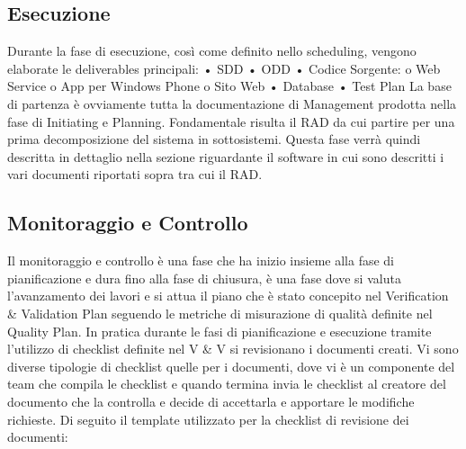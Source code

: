 \subsection{Esecuzione}
Durante la fase di esecuzione, così come definito nello scheduling, vengono elaborate le deliverables principali:
•	SDD
•	ODD
•	Codice Sorgente:
o	Web Service
o	App per Windows Phone
o	Sito Web
•	Database
•	Test Plan
La base di partenza è ovviamente tutta la documentazione di Management prodotta nella fase di Initiating e Planning. Fondamentale risulta il RAD da cui partire per una prima decomposizione del sistema in sottosistemi.
Questa fase verrà quindi descritta in dettaglio nella sezione riguardante il software in cui sono descritti i vari documenti riportati sopra tra cui il RAD.


\subsection{Monitoraggio e Controllo}
Il monitoraggio e controllo è una fase che ha inizio insieme alla fase di pianificazione e dura fino alla fase di chiusura, è una fase dove si valuta l’avanzamento dei lavori e si attua il piano che è stato concepito nel Verification \& Validation Plan seguendo le metriche di misurazione di qualità definite nel Quality Plan. In pratica durante le fasi di pianificazione e esecuzione tramite l’utilizzo di checklist definite nel V \& V si revisionano i documenti creati. Vi sono diverse tipologie di checklist quelle per i documenti, dove vi è un componente del team che compila le checklist e quando termina invia le checklist al creatore del documento che la controlla e decide di accettarla e apportare le modifiche richieste. Di seguito il template utilizzato per la checklist di revisione dei documenti:\\

